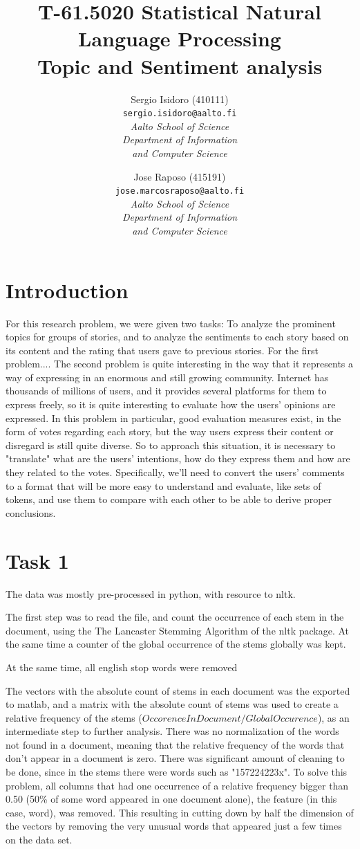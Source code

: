 \documentclass[a4paper,10pt]{article}
\title{T-61.5020 Statistical Natural Language Processing \\ Topic and Sentiment analysis}
\author{
Sergio Isidoro (410111)\\
\texttt{sergio.isidoro@aalto.fi} \\
\textit{Aalto School of Science} \\
\textit{Department of Information} \\
\textit{and Computer Science}
\and
Jose Raposo (415191)\\
\texttt{jose.marcosraposo@aalto.fi} \\
\textit{Aalto School of Science} \\
\textit{Department of Information} \\
\textit{and Computer Science}
}
\begin{document}
\maketitle

\section{Introduction}
For this research problem, we were given two tasks: To analyze the prominent topics for groups of stories, and to analyze the sentiments to each story based on its content and the rating that users gave to previous stories.
For the first problem....
The second problem is quite interesting in the way that it represents a way of expressing in an enormous and still growing community. Internet has thousands of millions of users, and it provides several platforms for them to express freely, so it is quite interesting to evaluate how the users' opinions are expressed. In this problem in particular, good evaluation measures exist, in the form of votes regarding each story, but the way users express their content or disregard is still quite diverse.
So to approach this situation, it is necessary to "translate" what are the users' intentions, how do they express them and how are they related to the votes.
Specifically, we'll need to convert the users' comments to a format that will be more easy to understand and evaluate, like sets of tokens, and use them to compare with each other to be able to derive proper conclusions.

\section{Task 1}

The data was mostly pre-processed in python, with resource to nltk.\

The first step was to read the file, and count the occurrence of each stem in the document, using the The Lancaster Stemming Algorithm of the nltk package. At the same time a counter of the global occurrence of the stems globally was kept.

At the same time, all english stop words were removed

The vectors with the absolute count of stems in each document was the exported to matlab, and a matrix with the absolute count of stems was used to create a relative frequency of the stems ($OccorenceInDocument/GlobalOccurence$), as an intermediate step to further analysis. There was no normalization of the words not found in a document, meaning that the relative frequency of the words that don't appear in a document is zero. There was significant amount of cleaning to be done, since in the stems there were words such as "157224223x". To solve this problem, all columns that had one occurrence of a relative frequency bigger than 0.50 (50\% of some word appeared in one document alone), the feature (in this case, word), was removed. This resulting in cutting down by half the dimension of the vectors by removing the very unusual words that appeared just a few times on the data set.
\end{document}
